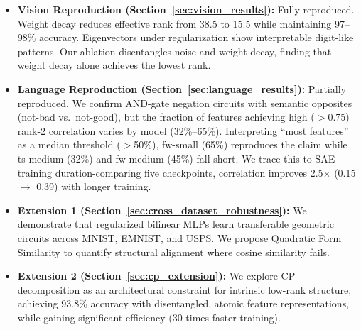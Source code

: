 \begin{itemize}[leftmargin=*,topsep=2pt,itemsep=2pt]
    \item \textbf{Vision Reproduction (Section~\ref{sec:vision_results}):} Fully reproduced. Weight decay reduces effective rank from 38.5 to 15.5 while maintaining 97--98\% accuracy.
    Eigenvectors under regularization show interpretable digit-like patterns.
    Our ablation disentangles noise and weight decay, finding that weight decay alone achieves the lowest rank.
    
    \item \textbf{Language Reproduction (Section~\ref{sec:language_results}):} Partially reproduced. We confirm AND-gate negation circuits with semantic opposites (not-bad vs.\ not-good), but the fraction of features achieving high ($>$0.75) rank-2 correlation varies by model (32\%--65\%).
    Interpreting ``most features'' as a median threshold ($>$50\%), fw-small (65\%) reproduces the claim while ts-medium (32\%) and fw-medium (45\%) fall short.
    We trace this to SAE training duration-comparing five checkpoints, correlation improves 2.5$\times$ (0.15 $\to$ 0.39) with longer training.
    
    \item \textbf{Extension 1 (Section~\ref{sec:cross_dataset_robustness}):} We demonstrate that regularized bilinear MLPs learn transferable geometric circuits across MNIST, EMNIST, and USPS. We propose Quadratic Form Similarity to quantify structural alignment where cosine similarity fails.
    
    \item \textbf{Extension 2 (Section~\ref{sec:cp_extension}):} We explore CP-decomposition as an architectural constraint for intrinsic low-rank structure, achieving 93.8\% accuracy with disentangled, atomic feature representations, while gaining significant efficiency (30 times faster training).
\end{itemize}
